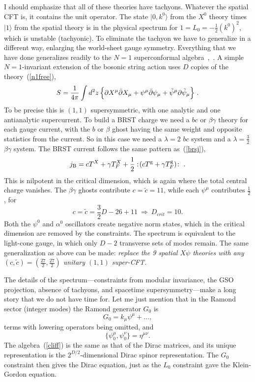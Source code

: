 I should emphasize that all of these theories have tachyons.
Whatever the spatial CFT is, it contains the unit operator.
The state $|0, k^0\rangle$ from the $X^0$ theory times
$|1\rangle$ from the spatial theory is in the physical spectrum
for $1 = L_0 = -\frac{1}{2} (k^0)^2$, which is unstable
(tachyonic).  To eliminate the tachyon we have to generalize in
a different way, enlarging the world-sheet gauge symmetry.  
Everything that we have done generalizes readily to the $N=1$
superconformal algebra~\cite{Rns},~\cite{rNS}.  A simple
$N=1$-invariant extension of the bosonic string action uses $D$
copies of the theory~(\ref{n1free}),
\begin{equation}
S= \frac{1}{4\pi} \int d^2z\,
\Bigl\{\partial X^\mu \bar\partial X_\mu + \psi^\mu \bar\partial
\psi_\mu + \tilde\psi^\mu \partial \tilde\psi_\mu\Bigr\}\ .
\label{n1act}
\end{equation}
To be precise this is $(1,1)$ supersymmetric, with one analytic and
one antianalytic supercurrent.  To build a BRST charge we need a $bc$
or $\beta\gamma$ theory for each gauge current, with the $b$ or
$\beta$ ghost having the same weight and opposite statistics from the
current.  So in this case we need a $\lambda = 2$ $bc$ system and a
$\lambda = \frac{3}{2}$ $\beta\gamma$ system.  The BRST current
follows the same pattern as~(\ref{brsj}),
\begin{equation}
j_{\rm B} = c T^X + \gamma T^X_F + \frac{1}{2}:\!  (c T^{\rm g}
+ \gamma T^{\rm g}_F ) \! :\ .
\end{equation}
This is nilpotent in the critical dimension, which is again where
the total central charge vanishes.  The $\beta\gamma$ ghosts
contribute $c = \tilde c = 11$, while each $\psi^\mu$ contributes
$\frac{1}{2}$, for
\begin{equation}
c = \tilde c = \frac{3}{2} D - 26 + 11\ \Rightarrow\ D_{crit} = 10.
\end{equation}
Both the $\psi^0$ and $\alpha^0$ oscillators create negative norm
states, which in the critical dimension are removed by the
constraints.  The spectrum is equivalent to the light-cone gauge, in
which only $D-2$ transverse sets of modes remain.  The same
generalization as above can be made: {\it replace the 9 spatial
$X\psi$ theories with any $(c, \tilde c) =
(\frac{27}{2},\frac{27}{2})$ unitary $(1,1)$ super-CFT.}
\label{gensec}

The details of the spectrum---constraints from modular invariance,
the GSO projection, absence of tachyons, and spacetime
supersymmetry---make a long story that we do not have time for.  Let
me just mention that in the Ramond sector (integer modes) the Ramond
generator $G_0$ is
\begin{equation}
G_0 = k_\mu \psi^\mu + \ldots,
\end{equation}
terms with lowering operators being omitted, and
\begin{equation}
\{ \psi^\mu_0, \psi^\nu_0 \} = \eta^{\mu\nu}. \label{cliff}
\end{equation}
The algebra~(\ref{cliff}) is the same as that of the Dirac matrices,
and its unique representation is the $2^{D/2}$-dimensional Dirac
spinor representation.  The $G_0$ constraint then gives the Dirac
equation, just as the $L_0$ constraint gave the Klein-Gordon
equation.

